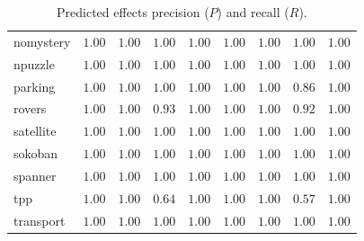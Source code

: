 \begin{table}[bht]
{\begin{tabular}{|l|cccc|cccc|}
nomystery & $\mathbf{1.00}$ & $\mathbf{1.00}$ & $\mathbf{1.00}$ & $\mathbf{1.00}$ & $\mathbf{1.00}$ & $\mathbf{1.00}$ & $\mathbf{1.00}$ & $\mathbf{1.00}$ \\
npuzzle & $\mathbf{1.00}$ & $\mathbf{1.00}$ & $\mathbf{1.00}$ & $\mathbf{1.00}$ & $\mathbf{1.00}$ & $\mathbf{1.00}$ & $\mathbf{1.00}$ & $\mathbf{1.00}$ \\
parking & $\mathbf{1.00}$ & $\mathbf{1.00}$ & $\mathbf{1.00}$ & $\mathbf{1.00}$ & $\mathbf{1.00}$ & $\mathbf{1.00}$ & $0.86$ & $\mathbf{1.00}$ \\
rovers & $\mathbf{1.00}$ & $\mathbf{1.00}$ & $0.93$ & $\mathbf{1.00}$ & $\mathbf{1.00}$ & $\mathbf{1.00}$ & $0.92$ & $\mathbf{1.00}$ \\
satellite & $\mathbf{1.00}$ & $\mathbf{1.00}$ & $\mathbf{1.00}$ & $\mathbf{1.00}$ & $\mathbf{1.00}$ & $\mathbf{1.00}$ & $\mathbf{1.00}$ & $\mathbf{1.00}$ \\
sokoban & $\mathbf{1.00}$ & $\mathbf{1.00}$ & $\mathbf{1.00}$ & $\mathbf{1.00}$ & $\mathbf{1.00}$ & $\mathbf{1.00}$ & $\mathbf{1.00}$ & $\mathbf{1.00}$ \\
spanner & $\mathbf{1.00}$ & $\mathbf{1.00}$ & $\mathbf{1.00}$ & $\mathbf{1.00}$ & $\mathbf{1.00}$ & $\mathbf{1.00}$ & $\mathbf{1.00}$ & $\mathbf{1.00}$ \\
tpp & $\mathbf{1.00}$ & $\mathbf{1.00}$ & $0.64$ & $\mathbf{1.00}$ & $\mathbf{1.00}$ & $\mathbf{1.00}$ & $0.57$ & $\mathbf{1.00}$ \\
transport & $\mathbf{1.00}$ & $\mathbf{1.00}$ & $\mathbf{1.00}$ & $\mathbf{1.00}$ & $\mathbf{1.00}$ & $\mathbf{1.00}$ & $\mathbf{1.00}$ & $\mathbf{1.00}$ \\
\hline
\end{tabular}
}
\caption{\small{Predicted effects precision ($P$) and recall ($R$).}}
\label{tab:predictedeffects}
\end{table}
